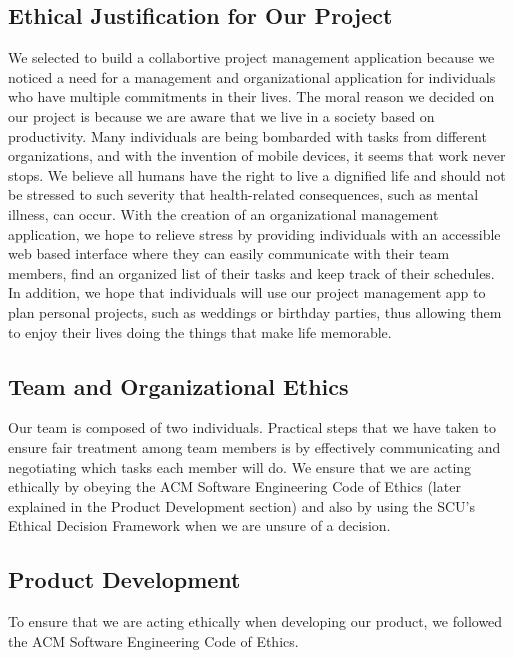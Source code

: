 \subsection{Ethical Justification for Our Project}
 We selected to build a collabortive project management application because we noticed a need for a management and organizational application for individuals who have multiple commitments in their lives. The moral reason we decided on our project is because we are aware that we live in a society based on productivity. Many individuals are being bombarded with tasks from different organizations, and with the invention of mobile devices, it seems that work never stops. We believe all humans have the right to live a dignified life and should not be stressed to such severity that health-related consequences, such as mental illness, can occur. With the creation of an organizational management application, we hope to relieve stress by providing individuals with an accessible web based interface where they can easily communicate with their team members, find an organized list of their tasks and keep track of their schedules. In addition, we hope that individuals will use our project management app to plan personal projects, such as weddings or birthday parties, thus allowing them to enjoy their lives doing the things that make life memorable. 
 \subsection{Team and Organizational Ethics}
 Our team is composed of two individuals. Practical steps that we have taken to ensure fair treatment among team members is by effectively communicating and negotiating which tasks each member will do. We ensure that we are acting ethically by obeying the ACM Software Engineering Code of Ethics (later explained in the Product Development section) and also by using the SCU’s Ethical Decision Framework when we are unsure of a decision. 
 \subsection{Product Development} 
To ensure that we are acting ethically when developing our product, we followed the ACM Software Engineering Code of Ethics. 


